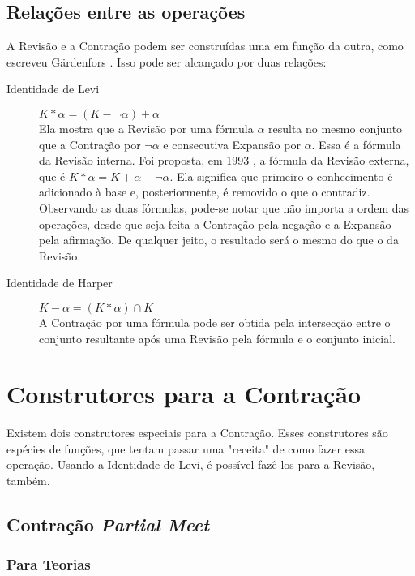 \subsection{Relações entre as operações}

A Revisão e a Contração podem ser construídas uma em função da outra, como escreveu Gärdenfors \cite{revisaoGardenfors}. Isso pode ser alcançado por duas relações:

\begin{description}
	\item[Identidade de Levi] $ K \ast \alpha = (K - \lnot \alpha) + \alpha $ \\ Ela mostra que a Revisão por uma fórmula $ \alpha $ resulta no mesmo conjunto que a Contração por $ \lnot \alpha $ e consecutiva Expansão por $ \alpha $. Essa é a fórmula da Revisão interna. Foi proposta, em 1993 \cite{revisaoHansson2}, a fórmula da Revisão externa, que é $ K \ast \alpha = K + \alpha - \lnot \alpha $. Ela significa que primeiro o conhecimento é adicionado à base e, posteriormente, é removido o que o contradiz. Observando as duas fórmulas, pode-se notar que não importa a ordem das operações, desde que seja feita a Contração pela negação e a Expansão pela afirmação. De qualquer jeito, o resultado será o mesmo do que o da Revisão.
	\item[Identidade de Harper] $ K - \alpha = (K \ast \alpha) \cap K $ \\ A Contração por uma fórmula pode ser obtida pela intersecção entre o conjunto resultante após uma Revisão pela fórmula e o conjunto inicial.
\end{description}

\section{Construtores para a Contração}

Existem dois construtores especiais para a Contração. Esses construtores são espécies de funções, que tentam passar uma "receita" de como fazer essa operação. Usando a Identidade de Levi, é possível fazê-los para a Revisão, também.

\subsection{Contração \textit{Partial Meet}}

\subsubsection{Para Teorias}

